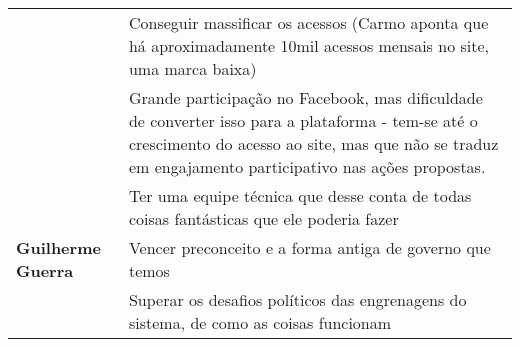 \begin{quadro}[htb]
{\begin{tabular}{|p{2.8cm}|p{12cm}|}
          &
          Conseguir massificar os acessos (Carmo aponta que há aproximadamente 10mil acessos mensais no site, uma marca baixa) \\
          &
          Grande participação no Facebook, mas dificuldade de converter isso para a plataforma - tem-se até o crescimento do acesso ao site, mas que não se traduz em engajamento participativo nas ações propostas. \\
        \hline
          &
          Ter uma equipe técnica que desse conta de todas coisas fantásticas que ele poderia fazer \\
          \textbf{Guilherme Guerra} &
          Vencer preconceito e a forma antiga de governo que temos \\
          &
          Superar os desafios políticos das engrenagens do sistema, de como as coisas funcionam \\
        \hline
      \end{tabular}
      \normalsize
  }{%
  }
\end{quadro}

